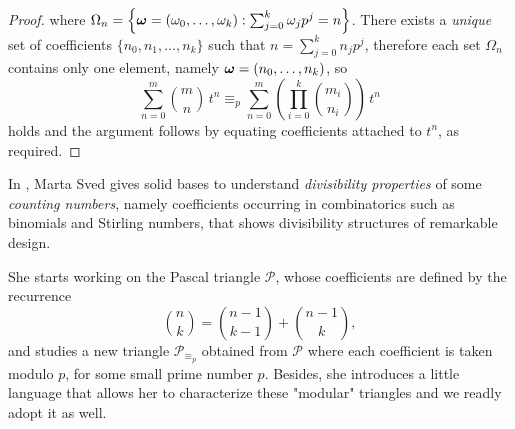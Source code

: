 \begin{proof}
    where $\Omega_{n}=\left\lbrace\boldsymbol{\omega}=\left(\omega_{0},\ldots,\omega_{k}\right):
        \sum_{j=0}^{k}{\omega_{j}p^{j}}=n\right\rbrace$.
    There exists a \emph{unique} set of coefficients
    $\lbrace n_{0},n_{1},\ldots,n_{k}\rbrace$ such that $n=\sum_{j=0}^{k}{n_{j}p^{j}}$, therefore
    each set $\Omega_{n}$ contains only one element, namely $\boldsymbol{\omega}=(n_{0},\ldots,n_{k})$, so
    \begin{displaymath}
        \sum_{n=0}^{m}{{{m}\choose{n}}\,t^{n}} 
        \equiv_{p} \sum_{n=0}^{m}{\left({\prod_{i=0}^{k}{{{m_{i}}\choose{n_{i}}}}}\right)\,t^{n}}
    \end{displaymath}
    holds and the argument follows by equating coefficients attached to $t^{n}$, 
    as required.

\end{proof}
\fi


In \cite{sved:1988}, Marta Sved gives solid bases to understand
\textit{divisibility properties} of some \emph{counting numbers}, namely
coefficients occurring in combinatorics such as binomials and Stirling numbers,
that shows divisibility structures of remarkable design. 

She starts working on the Pascal triangle $\mathcal{P}$, whose coefficients
are defined by the recurrence
\begin{equation}
    {{n}\choose{k}}={{n-1}\choose{k-1}}+{{n-1}\choose{k}},
    \label{eq:binomial:recurrence}
\end{equation}
and studies a new triangle $\mathcal{P}_{\equiv_{p}}$ obtained from
$\mathcal{P}$ where each coefficient is taken modulo $p$, for some small prime
number $p$. Besides, she introduces a little language that allows her to
characterize these "modular" triangles and we readly adopt it as well.

